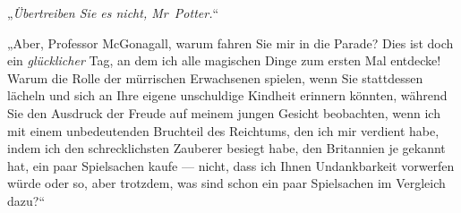 „\emph{Übertreiben Sie es nicht, Mr~Potter.}“

„Aber, Professor McGonagall, warum fahren Sie mir in die Parade? Dies ist doch ein \emph{glücklicher} Tag, an dem ich alle magischen Dinge zum ersten Mal entdecke! Warum die Rolle der mürrischen Erwachsenen spielen, wenn Sie stattdessen lächeln und sich an Ihre eigene unschuldige Kindheit erinnern könnten, während Sie den Ausdruck der Freude auf meinem jungen Gesicht beobachten, wenn ich mit einem unbedeutenden Bruchteil des Reichtums, den ich mir verdient habe, indem ich den schrecklichsten Zauberer besiegt habe, den Britannien je gekannt hat, ein paar Spielsachen kaufe — nicht, dass ich Ihnen Undankbarkeit vorwerfen würde oder so, aber trotzdem, was sind schon ein paar Spielsachen im Vergleich dazu?“

